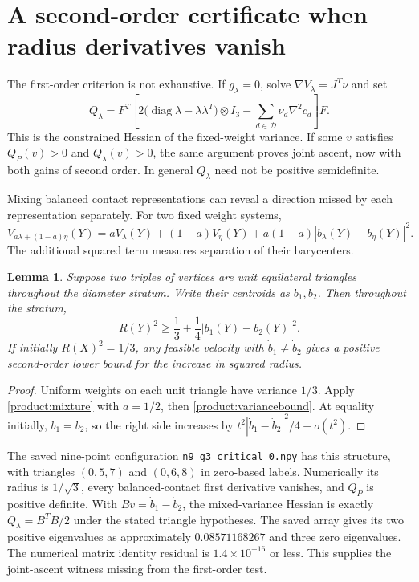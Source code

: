 \documentclass[11pt]{article}
\newtheorem{lemma}[theorem]{Lemma}
\theoremstyle{remark}\newtheorem{remark}[theorem]{Remark}
\begin{document}
\section{A second-order certificate when radius derivatives vanish}
The first-order criterion is not exhaustive. If $g_\lambda=0$, solve
$\nabla V_\lambda=J^T\nu$ and set
\begin{equation}\label{product:variancehessian}
 Q_\lambda=F^T\left[
 2\bigl(\operatorname{diag}\lambda-\lambda\lambda^T\bigr)\otimes I_3
 -\sum_{d\in\mathcal D}\nu_d\nabla^2c_d\right]F.
\end{equation}
This is the constrained Hessian of the fixed-weight variance.
If some $v$ satisfies $Q_P(v)>0$ and $Q_\lambda(v)>0$, the same
argument proves joint ascent, now with both gains of second order.
In general $Q_\lambda$ need not be positive semidefinite.

Mixing balanced contact representations can reveal a direction missed
by each representation separately. For two fixed weight systems,
\begin{equation}\label{product:mixture}
 V_{a\lambda+(1-a)\eta}(Y)
 =aV_\lambda(Y)+(1-a)V_\eta(Y)
 +a(1-a)|b_\lambda(Y)-b_\eta(Y)|^2.
\end{equation}
The additional squared term measures separation of their barycenters.

\begin{lemma}\label{product:triangles}
Suppose two triples of vertices are unit equilateral triangles
throughout the diameter stratum. Write their centroids as $b_1,b_2$.
Then throughout the stratum,
\begin{equation}\label{product:twotriangles}
 R(Y)^2\geq\frac13+\frac14|b_1(Y)-b_2(Y)|^2.
\end{equation}
If initially $R(X)^2=1/3$, any feasible velocity with
$\dot b_1\ne\dot b_2$ gives a positive second-order lower bound for
the increase in squared radius.
\end{lemma}
\begin{proof}
Uniform weights on each unit triangle have variance $1/3$.
Apply \eqref{product:mixture} with $a=1/2$, then \eqref{product:variancebound}.
At equality initially, $b_1=b_2$, so the right side increases by
$t^2|\dot b_1-\dot b_2|^2/4+o(t^2)$.
\end{proof}

The saved nine-point configuration \texttt{n9\_g3\_critical\_0.npy}
has this structure, with triangles $(0,5,7)$ and $(0,6,8)$ in zero-based
labels. Numerically its radius is $1/\sqrt3$, every balanced-contact
first derivative vanishes, and $Q_P$ is positive definite. With
$Bv=\dot b_1-\dot b_2$, the mixed-variance Hessian is exactly
$Q_\lambda=B^TB/2$ under the stated triangle hypotheses. The saved
array gives its two positive eigenvalues as approximately
$0.08571168267$ and three zero eigenvalues. The numerical matrix
identity residual is $1.4\times10^{-16}$ or less. This supplies the
joint-ascent witness missing from the first-order test.
\end{document}

